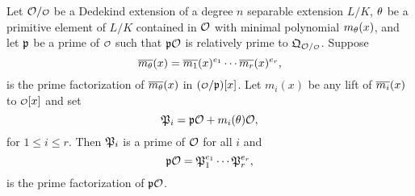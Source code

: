     \begin{theorem*}
      Let $\mc{O}/\smc{O}$ be a Dedekind extension of a degree $n$ separable extension $L/K$, $\theta$ be a primitive element of $L/K$ contained in $\mathcal{O}$ with minimal polynomial $m_{\theta}(x)$, and let $\mathfrak{p}$ be a prime of $\smc{O}$ such that $\mathfrak{p}\mathcal{O}$ is relatively prime to $\mf{Q}_{\mc{O}/\smc{O}}$. Suppose
      \[
        \overline{m_{\theta}}(x) = \overline{m_{1}}(x)^{e_{1}} \cdots \overline{m_{r}}(x)^{e_{r}},
      \]
      is the prime factorization of $\overline{m_{\theta}}(x)$ in $(\smc{O}/\mf{p})[x]$. Let $m_{i}(x)$ be any lift of $\overline{m_{i}}(x)$ to $\smc{O}[x]$ and set
      \[
        \mathfrak{P}_{i} = \mathfrak{p}\mathcal{O}+m_{i}(\theta)\mathcal{O},
      \]
      for $1 \le i \le r$. Then $\mathfrak{P}_{i}$ is a prime of $\mathcal{O}$ for all $i$ and
      \[
        \mathfrak{p}\mathcal{O} = \mathfrak{P}_{1}^{e_{1}} \cdots \mathfrak{P}_{r}^{e_{r}},
      \]
      is the prime factorization of $\mathfrak{p}\mathcal{O}$.
    \end{theorem*}
